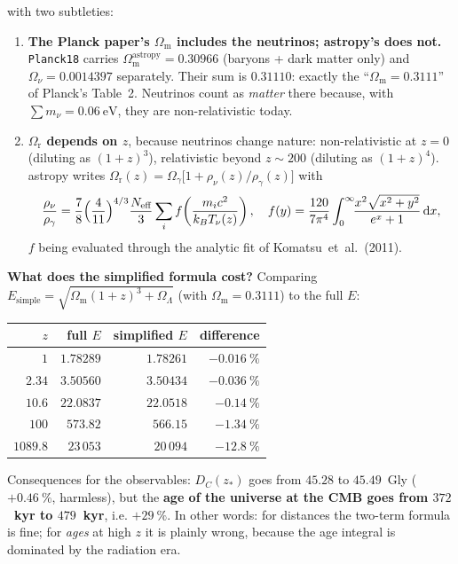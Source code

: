 \documentclass[11pt,a4paper,openany]{report}
\newcommand{\Om}{\Omega_{\mathrm{m}}}
\newcommand{\Or}{\Omega_{\mathrm{r}}}
\newcommand{\OL}{\Omega_{\Lambda}}
\newcommand{\dif}{\mathrm{d}}
\begin{document}
\noindent with two subtleties:

\begin{enumerate}[topsep=3pt]
\item \textbf{The Planck paper's $\Om$ includes the neutrinos; astropy's does
not.} \texttt{Planck18} carries $\Om^{\text{astropy}} = 0.30966$ (baryons +
dark matter only) and $\Omega_{\nu} = 0.0014397$ separately. Their sum is
$0.31110$: exactly the “$\Om = 0.3111$” of Planck's Table~2. Neutrinos count
as \emph{matter} there because, with $\sum m_{\nu} = \SI{0.06}{\electronvolt}$,
they are non-relativistic today.

\item \textbf{$\Or$ depends on $z$}, because neutrinos change nature:
non-relativistic at $z=0$ (diluting as $(1+z)^{3}$), relativistic beyond
$z \sim 200$ (diluting as $(1+z)^{4}$). astropy writes
$\Or(z) = \Omega_{\gamma}\bigl[1 + \rho_{\nu}(z)/\rho_{\gamma}(z)\bigr]$ with
\[
\frac{\rho_{\nu}}{\rho_{\gamma}} = \frac{7}{8}\Bigl(\frac{4}{11}\Bigr)^{4/3}
\frac{N_{\text{eff}}}{3}\sum_{i} f\!\left(\frac{m_{i}c^{2}}{k_{B}T_{\nu}(z)}\right),
\quad
f(y) = \frac{120}{7\pi^{4}}\int_{0}^{\infty}\!\!
       \frac{x^{2}\sqrt{x^{2}+y^{2}}}{e^{x}+1}\,\dif x ,
\]
$f$ being evaluated through the analytic fit of Komatsu~et~al.~(2011).
\end{enumerate}

\begin{tcolorbox}[numeric]
\textbf{What does the simplified formula cost?} Comparing
$E_{\text{simple}} = \sqrt{\Om(1+z)^{3}+\OL}$ (with $\Om = 0.3111$) to the full
$E$:

\medskip
\begin{tabular}{rrrr}
\toprule
$z$ & full $E$ & simplified $E$ & difference \\
\midrule
$1$      & $1.78289$   & $1.78261$   & $-0.016~\%$ \\
$2.34$   & $3.50560$   & $3.50434$   & $-0.036~\%$ \\
$10.6$   & $22.0837$   & $22.0518$   & $-0.14~\%$ \\
$100$    & $573.82$    & $566.15$    & $-1.34~\%$ \\
$1089.8$ & $23\,053$   & $20\,094$   & $\mathbf{-12.8~\%}$ \\
\bottomrule
\end{tabular}

\medskip
Consequences for the observables: $D_{C}(z_{*})$ goes from $45.28$ to
$45.49$~Gly ($+0.46~\%$, harmless), but the \textbf{age of the universe at the
CMB goes from $372$~kyr to $479$~kyr}, i.e. $+29~\%$. In other words: for
distances the two-term formula is fine; for \emph{ages} at high $z$ it is
plainly wrong, because the age integral is dominated by the radiation era.
\end{tcolorbox}
\end{document}

